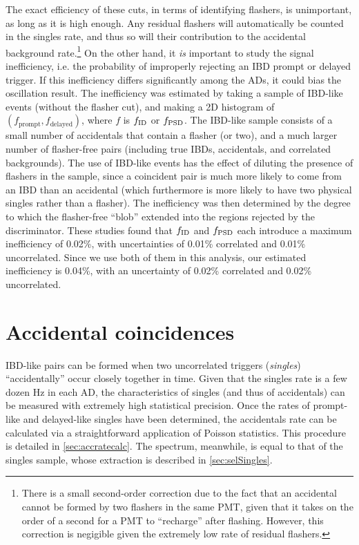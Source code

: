 \documentclass[../thesis.tex]{subfiles}
\begin{document}
The exact efficiency of these cuts, in terms of identifying flashers, is unimportant, as long as it is high enough. Any residual flashers will automatically be counted in the singles rate, and thus so will their contribution to the accidental background rate.\footnote{There is a small second-order correction due to the fact that an accidental cannot be formed by two flashers in the same PMT, given that it takes on the order of a second for a PMT to ``recharge'' after flashing. However, this correction is negigible given the extremely low rate of residual flashers.} On the other hand, it \emph{is} important to study the signal inefficiency, i.e. the probability of improperly rejecting an IBD prompt or delayed trigger. If this inefficiency differs significantly among the ADs, it could bias the oscillation result. The inefficiency was estimated \cite{xinFlasherEff1,xinFlasherEff2} by taking a sample of IBD-like events (without the flasher cut), and making a 2D histogram of $(f_{\mathrm{prompt}},f_{\mathrm{delayed}})$, where $f$ is $f_{\mathrm{ID}}$ or $f_{\mathrm{PSD}}$. The IBD-like sample consists of a small number of accidentals that contain a flasher (or two), and a much larger number of flasher-free pairs (including true IBDs, accidentals, and correlated backgrounds). The use of IBD-like events has the effect of diluting the presence of flashers in the sample, since a coincident pair is much more likely to come from an IBD than an accidental (which furthermore is more likely to have two physical singles rather than a flasher). The inefficiency was then determined by the degree to which the flasher-free ``blob'' extended into the regions rejected by the discriminator.
These studies found that $f_{\mathrm{ID}}$ and $f_{\mathrm{PSD}}$ each introduce a maximum inefficiency of 0.02\%, with uncertainties of 0.01\% correlated and 0.01\% uncorrelated.
Since we use both of them in this analysis, our estimated inefficiency is 0.04\%, with an uncertainty of 0.02\% correlated and 0.02\% uncorrelated.


\section{Accidental coincidences}
\label{sec:accbkg}

IBD-like pairs can be formed when two uncorrelated triggers (\emph{singles}) ``accidentally'' occur closely together in time. Given that the singles rate is a few dozen Hz in each AD, the characteristics of singles (and thus of accidentals) can be measured with extremely high statistical precision. Once the rates of prompt-like and delayed-like singles have been determined, the accidentals rate can be calculated via a straightforward application of Poisson statistics. This procedure is detailed in \autoref{sec:accratecalc}. The spectrum, meanwhile, is equal to that of the singles sample, whose extraction is described in \autoref{sec:selSingles}.
\end{document}
